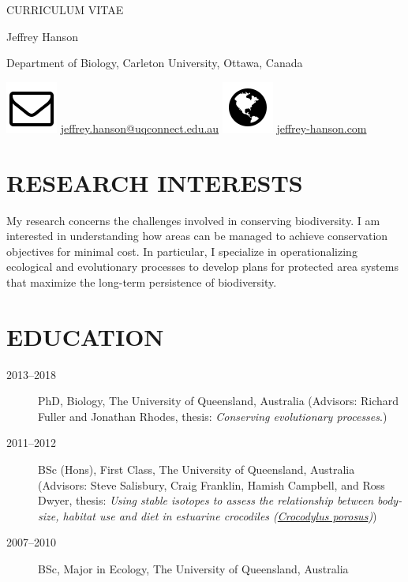 \documentclass[12pt,a4paper]{article}
\begin{document}
\begin{center}

CURRICULUM VITAE

Jeffrey Hanson

Department of Biology, Carleton University, Ottawa, Canada

\includegraphics[scale=0.2]{envelope-o.png} \href{mailto:jeffrey.hanson@uqconnect.edu.au}{jeffrey.hanson@uqconnect.edu.au} \hspace{0.5em} \includegraphics[scale=0.2]{globe.png} \url{jeffrey-hanson.com}

\end{center}

\section*{RESEARCH INTERESTS}

My research concerns the challenges involved in conserving biodiversity. I am interested in understanding how areas can be managed to achieve conservation objectives for minimal cost. In particular, I specialize in operationalizing ecological and evolutionary processes to develop plans for protected area systems that maximize the long-term persistence of biodiversity.

\section*{EDUCATION}
\begin{description}

\item[2013--2018] PhD, Biology, The University of Queensland, Australia (Advisors: Richard Fuller and Jonathan Rhodes, thesis: \textit{Conserving evolutionary processes}.)

\item[2011--2012] BSc (Hons), First Class, The University of Queensland, Australia (Advisors: Steve Salisbury, Craig Franklin, Hamish Campbell, and Ross Dwyer, thesis: \textit{Using stable isotopes to assess the relationship between body-size, habitat use and diet in estuarine crocodiles (\underline{Crocodylus porosus})})

\item[2007--2010] BSc, Major in Ecology, The University of Queensland, Australia

\end{description}
\end{document}
